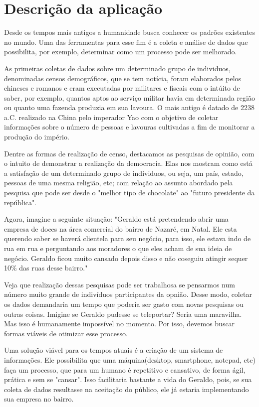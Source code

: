 \documentclass[a4paper,12pt]{report}
\begin{document}
\section*{Descrição da aplicação}
\markright{}
Desde os tempos mais antigos a humanidade busca conhecer os padrões existentes no mundo. Uma das ferramentas para esse fim é a coleta e análise de dados que possibilita, por exemplo, determinar como um processo pode ser melhorado.
\par As primeiras coletas de dados sobre um determinado grupo de individuos, denominadas censos demográficos, que se tem notícia, foram elaborados pelos chineses e romanos e eram executadas por militares e fiscais com o intúito de saber, por exemplo, quantos aptos ao serviço militar havia em determinada região ou quanto uma fazenda produzia em sua lavoura. O mais antigo é datado de 2238 a.C. realizado na China pelo imperador Yao com o objetivo de coletar informações sobre o número de pessoas e lavouras cultivadas a fim de monitorar a produção do império.
\par Dentre as formas de realização de censo, destacamos as pesquisas de opinião, com o intuito de demonstrar a realização da democracia. Elas nos mostram como está a satisfação de um determinado grupo de individuos, ou seja, um país, estado, pessoas de uma mesma religião, etc; com relação ao assunto abordado pela pesquisa que pode ser desde o "melhor tipo de chocolate" ao "futuro presidente da república".
\par Agora, imagine a seguinte situação: "Geraldo está pretendendo abrir uma empresa de doces na área comercial do bairro de Nazaré, em Natal. Ele esta querendo saber se haverá clientela para seu negócio, para isso, ele estava indo de rua em rua e perguntando aos moradores o que eles acham de sua ideia de negócio. Geraldo ficou muito cansado depois disso e não coseguiu atingir sequer 10\% das ruas desse bairro."
\par Veja que realização dessas pesquisas pode ser trabalhosa se pensarmos num número muito grande de indivíduos participantes da opnião. Desse modo, coletar os dados demandaria um tempo que poderia ser gasto com novas pesquisas ou outras coisas. Imigine se Geraldo pudesse se teleportar? Seria uma maravilha. Mas isso é humanamente impossível no momento. Por isso, devemos buscar formas viáveis de otimizar esse processo.
\par Uma solução viável para os tempos atuais é a criação de um sistema de informações. Ele possibilita que uma máquina(desktop, smartphone, notepad, etc) faça um processo, que para um humano é repetitivo e cansativo, de forma ágil, prática e sem se "cansar". Isso facilitaria bastante a vida do Geraldo, pois, se sua coleta de dados resultasse na aceitação do público, ele já estaria implementando sua empresa no bairro.
\end{document}
